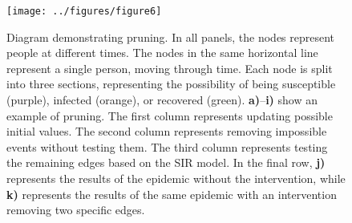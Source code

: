 \documentclass[openacc]{rsproca_new}%
\begin{document}
% 
\begin{figure}\label{fig:pruning}
\texttt{[image: ../figures/figure6]} %
\caption{Diagram demonstrating pruning.  In all panels, the nodes represent people at different times.  The nodes in the same horizontal line represent a single person, moving through time.  Each node is split into three sections, representing the possibility of being susceptible (purple), infected (orange), or recovered (green).  \textbf{a)}--\textbf{i)} show an example of pruning.  The first column represents updating possible initial values.  The second column represents removing impossible events without testing them.  The third column represents testing the remaining edges based on the SIR model.  In the final row, \textbf{j)} represents the results of the epidemic without the intervention, while \textbf{k)} represents the results of the same epidemic with an intervention removing two specific edges.}
\end{figure}
\end{document}
